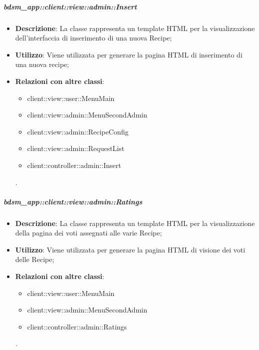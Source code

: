 		\subparagraph{bdsm\_app::client::view::admin::Insert} %
		\label{subp:bdsm_app_client_view_admin_insert}
			\begin{itemize}
				\item \textbf{Descrizione}: La classe rappresenta un template HTML per la visualizzazione dell'interfaccia di inserimento di una nuova Recipe;
				\item \textbf{Utilizzo}: Viene utilizzata per generare la pagina HTML di inserimento di una nuova recipe;
				\item \textbf{Relazioni con altre classi}: 		
					\begin{itemize}
						\item client::view::user::MenuMain
						\item client::view::admin::MenuSecondAdmin
						\item client::view::admin::RecipeConfig
						\item client::view::admin::RequestList
						\item client::controller::admin::Insert
					\end{itemize}.
			\end{itemize}

		\subparagraph{bdsm\_app::client::view::admin::Ratings} %
		\label{subp:bdsm_app_client_view_admin_ratings}
			\begin{itemize}
				\item \textbf{Descrizione}: La classe rappresenta un template HTML per la visualizzazione della pagina dei voti assegnati alle varie Recipe;
				\item \textbf{Utilizzo}: Viene utilizzata per generare la pagina HTML di visione dei voti delle Recipe;
				\item \textbf{Relazioni con altre classi}: 		
					\begin{itemize}
						\item client::view::user::MenuMain
						\item client::view::admin::MenuSecondAdmin
						\item client::controller::admin::Ratings
					\end{itemize}.
			\end{itemize}


